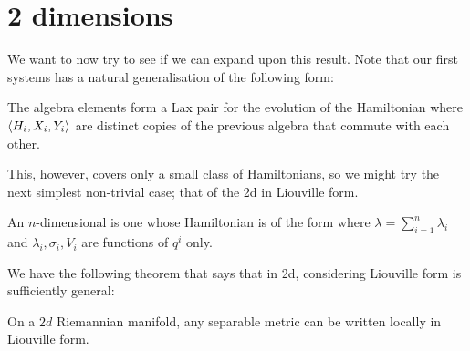 \documentclass{article}
\begin{document}
\section{2 dimensions}
We want to now try to see if we can expand upon this result. Note that our first systems has a natural generalisation of the following form:
\begin{prop}
The algebra elements 
form a Lax pair for the evolution of the Hamiltonian 
where $\left\langle H_i,X_i,Y_i \right\rangle$ are distinct copies of the previous algebra that commute with each other. 
\end{prop}
This, however, covers only a small class of Hamiltonians, so we might try the next simplest non-trivial case; that of the 2d in Liouville form.
\begin{definition}
	An $n$-dimensional  is one whose Hamiltonian is of the form 
where $\lambda = \sum_{i=1}^n \lambda_i$ and $\lambda_i,\sigma_i,V_i$ are functions of $q^i$ only.
\end{definition}
We have the following theorem that says that in 2d, considering Liouville form is sufficiently general:
\begin{theorem}
	On a $2d$ Riemannian manifold, any separable metric can be written locally in Liouville form. 
\end{theorem}
\end{document}
